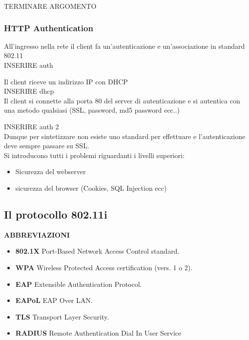\documentclass[12pt]{article}
\begin{document}
				TERMINARE ARGOMENTO
				
			\subsubsection{HTTP Authentication}
				All'ingresso nella rete il client fa un'autenticazione e un'associazione in standard 802.11\\
				
				INSERIRE auth 
				
				Il client riceve un indirizzo IP con DHCP\\
				
				INSERIRE dhcp\\
				
				Il client si connette alla porta 80 del server di autenticazione e si autentica con una metodo qualsiasi (SSL, password, md5 password ecc..) 
				
				INSERIRE auth 2\\
				
				Dunque per sintetizzare non esiste uno standard per effettuare e l'autenticazione deve sempre passare su SSL.\\
				Si introducono tutti i problemi riguardanti i livelli superiori:
				\begin{itemize}
					\item Sicurezza del webserver 
					\item sicurezza del browser (Cookies, SQL Injection ecc)
				\end{itemize}
			
		\subsection{Il protocollo 802.11i}
			\begin{center}
				\textbf{ABBREVIAZIONI}
			\end{center}
			\begin{itemize}
				\item \textbf{802.1X} Port-Based Network Access Control standard.
				\item \textbf{WPA} Wireless Protected Access certification (vers. 1 o
				2).
				\item \textbf{EAP} Extensible Authentication Protocol.
				\item \textbf{EAPoL} EAP Over LAN.
				\item \textbf{TLS} Transport Layer Security.
				\item \textbf{RADIUS} Remote Authentication Dial In User Service
			\end{itemize}
\end{document}
